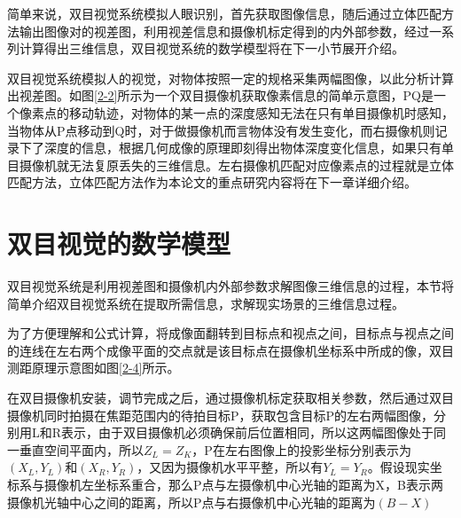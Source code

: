 简单来说，双目视觉系统模拟人眼识别，首先获取图像信息，随后通过立体匹配方法输出图像对的视差图，利用视差信息和摄像机标定得到的内外部参数，经过一系列计算得出三维信息，双目视觉系统的数学模型将在下一小节展开介绍。

双目视觉系统模拟人的视觉，对物体按照一定的规格采集两幅图像，以此分析计算出视差图。如图\ref{2-2}所示为一个双目摄像机获取像素信息的简单示意图，PQ是一个像素点的移动轨迹，对物体的某一点的深度感知无法在只有单目摄像机时感知，当物体从P点移动到Q时，对于做摄像机而言物体没有发生变化，而右摄像机则记录下了深度的信息，根据几何成像的原理即刻得出物体深度变化信息，如果只有单目摄像机就无法复原丢失的三维信息。左右摄像机匹配对应像素点的过程就是立体匹配方法，立体匹配方法作为本论文的重点研究内容将在下一章详细介绍。


\section{双目视觉的数学模型}

双目视觉系统是利用视差图和摄像机内外部参数求解图像三维信息的过程，本节将简单介绍双目视觉系统在提取所需信息，求解现实场景的三维信息过程。


为了方便理解和公式计算，将成像面翻转到目标点和视点之间，目标点与视点之间的连线在左右两个成像平面的交点就是该目标点在摄像机坐标系中所成的像，双目测距原理示意图如图\ref{2-4}所示。

在双目摄像机安装，调节完成之后，通过摄像机标定获取相关参数，然后通过双目摄像机同时拍摄在焦距范围内的待拍目标P，获取包含目标P的左右两幅图像，分别用L和R表示，由于双目摄像机必须确保前后位置相同，所以这两幅图像处于同一垂直空间平面内，所以$Z_{L}=Z_{K}$，P在左右图像上的投影坐标分别表示为$(X_{L},Y_{L})$和$(X_{R},Y_{R})$，又因为摄像机水平平整，所以有$Y_{L}=Y_{R}$。假设现实坐标系与摄像机左坐标系重合，那么P点与左摄像机中心光轴的距离为X，B表示两摄像机光轴中心之间的距离，所以P点与右摄像机中心光轴的距离为$(B-X)$

